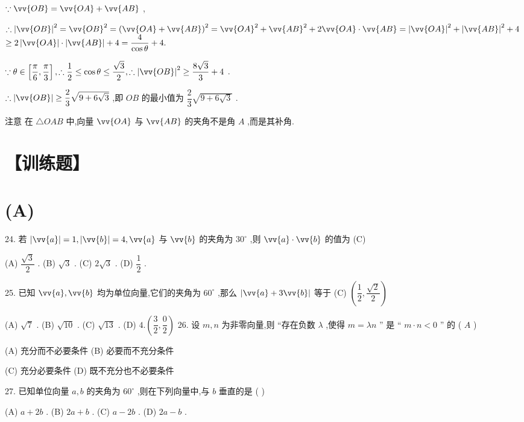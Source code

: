 $\because \vv{OB} = \vv{OA} + \vv{AB}$ ,

$\therefore {\left| \vv{OB}\right| }^{2} = {\vv{OB}}^{2} = {\left( \vv{OA} + \vv{AB}\right) }^{2} = {\vv{OA}}^{2} + {\vv{AB}}^{2} + 2\vv{OA} \cdot  \vv{AB} = {\left| \vv{OA}\right| }^{2} + {\left| \vv{AB}\right| }^{2} + 4$  $\geq  2\left| \vv{OA}\right|  \cdot  \left| \vv{AB}\right|  + 4 = \dfrac{4}{\cos \theta } + 4.$

$\because \theta  \in  \left\lbrack  {\dfrac{\pi }{6},\dfrac{\pi }{3}}\right\rbrack  ,\therefore \dfrac{1}{2} \leq  \cos \theta  \leq  \dfrac{\sqrt{3}}{2},\therefore {\left| \vv{OB}\right| }^{2} \geq  \dfrac{8\sqrt{3}}{3} + 4$ .

$\therefore \left| \vv{OB}\right|  \geq  \dfrac{2}{3}\sqrt{9 + 6\sqrt{3}}$ ,即 ${OB}$ 的最小值为 $\dfrac{2}{3}\sqrt{9 + 6\sqrt{3}}$ .

注意 在 $\bigtriangleup {OAB}$ 中,向量 $\vv{OA}$ 与 $\vv{AB}$ 的夹角不是角 $A$ ,而是其补角.

\section*{【训练题】}

\section*{(A)}

24. 若 $\left| \vv{a}\right|  = 1,\left| \vv{b}\right|  = 4,\vv{a}$ 与 $\vv{b}$ 的夹角为 ${30}^{ \circ  }$ ,则 $\vv{a} \cdot  \vv{b}$ 的值为 (C)

(A) $\dfrac{\sqrt{3}}{2}$ . (B) $\sqrt{3}$ . (C) $2\sqrt{3}$ . (D) $\dfrac{1}{2}$ .

25. 已知 $\vv{a},\vv{b}$ 均为单位向量,它们的夹角为 ${60}^{ \circ  }$ ,那么 $\left| {\vv{a} + 3\vv{b}}\right|$ 等于 (C) $\left( {\dfrac{1}{2},\dfrac{\sqrt{2}}{2}}\right)$

(A) $\sqrt{7}$ . (B) $\sqrt{10}$ . (C) $\sqrt{13}$ . (D) $4.\left( {\dfrac{3}{2},\dfrac{0}{2}}\right)$ 26. 设 $m,n$ 为非零向量,则 “存在负数 $\lambda$ ,使得 $m = {\lambda n}$ ” 是 “ $m \cdot  n < 0$ ” 的 ( $A$ )

(A) 充分而不必要条件 (B) 必要而不充分条件

(C) 充分必要条件 (D) 既不充分也不必要条件

27. 已知单位向量 $a,b$ 的夹角为 ${60}^{ \circ  }$ ,则在下列向量中,与 $b$ 垂直的是 (   )

(A) $a + {2b}$ . (B) ${2a} + b$ . (C) $a - {2b}$ . (D) ${2a} - b$ .

